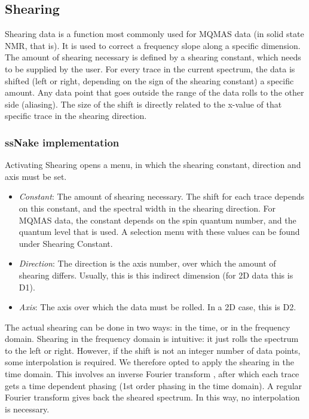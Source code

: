 \documentclass[11pt,a4paper]{article}
\begin{document}
\subsection{Shearing}
Shearing data is a function most commonly used for MQMAS data (in solid state NMR, that is). It is used to correct a frequency slope along a specific dimension.
The amount of shearing necessary is defined by a shearing constant, which needs to be supplied by the user. 
For every trace in the current spectrum, the data is shifted (left or right, depending on the sign of the shearing constant) a specific amount. Any data point that goes outside 
the range of the data rolls to the other side (aliasing). The size of the shift is directly related to the x-value of that specific trace in the shearing direction.


\subsubsection*{ssNake implementation}
Activating Shearing opens a menu, in which the shearing constant, direction and axis must be set.

\begin{itemize}
  \item \textit{Constant}: The amount of shearing necessary. The shift for each trace depends on this constant, and the spectral width in the shearing direction.
	 For MQMAS data, the constant depends on the spin quantum number, and the quantum level that is used. A selection menu with these values can be found under Shearing Constant.
  \item \textit{Direction}: The direction is the axis number, over which the amount of shearing differs. Usually, this is this indirect dimension (for 2D data this is D1).
  \item \textit{Axis}: The axis over which the data must be rolled. In a 2D case, this is D2.
\end{itemize}

The actual shearing can be done in two ways: in the time, or in the frequency domain. Shearing in the frequency domain is intuitive: it just rolls the spectrum to the left or right.
However, if the shift is not an integer number of data points, some interpolation is required. We therefore opted to apply the shearing in the time domain. This involves an inverse Fourier transform
, after which each trace gets a time dependent phasing (1st order phasing in the time domain). A regular Fourier transform gives back the sheared spectrum.
In this way, no interpolation is necessary.
\end{document}
